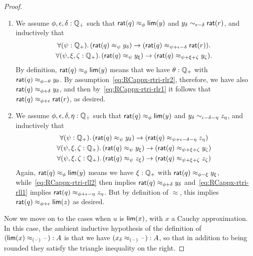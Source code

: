 \begin{proof}
\begin{enumerate}
  \item We assume $\phi,\epsilon,\delta:\mathbb{Q}_{+}$ such that $\mathsf{rat}(q)\approx_\phi \mathsf{lim}(y)$ and $y_\delta \sim_{\epsilon-\delta} \mathsf{rat}(r)$, and inductively that
    \begin{gather}
      \fall{\psi:\Qp}(\rcrat(q) \approx_{\psi} y_\delta) \to (\rcrat(q) \approx_{\psi+\epsilon-\delta} \rcrat(r)).\label{eq:RCappx-rtri-rlr1}\\
      \fall{\psi,\xi,\zeta:\Qp} (\rcrat(q) \approx_{\psi} y_\xi) \to (\rcrat(q) \approx_{\psi+\xi+\zeta} y_\zeta).\label{eq:RCappx-rtri-rlr2}
    \end{gather}
    By definition, $\mathsf{rat}(q)\approx_\phi \mathsf{lim}(y)$ means that we have $\theta:\mathbb{Q}_{+}$ with $\mathsf{rat}(q) \approx_{\phi-\theta} y_\theta$.
    By assumption~\eqref{eq:RCappx-rtri-rlr2}, therefore, we have also $\mathsf{rat}(q) \approx_{\phi+\delta} y_\delta$, and then by~\eqref{eq:RCappx-rtri-rlr1} it follows that $\mathsf{rat}(q) \approx_{\phi+\epsilon} \mathsf{rat}(r)$, as desired.
  \item We assume $\phi,\epsilon,\delta,\eta:\mathbb{Q}_{+}$ such that $\mathsf{rat}(q)\approx_\phi \mathsf{lim}(y)$ and $y_\delta \sim_{\epsilon-\delta-\eta} z_\eta$, and inductively that 
    \begin{gather}
      \fall{\psi:\Qp}(\rcrat(q) \approx_{\psi} y_\delta) \to (\rcrat(q) \approx_{\psi+\epsilon-\delta-\eta} z_\eta)\label{eq:RCappx-rtri-rll1}\\
      \fall{\psi,\xi,\zeta:\Qp} (\rcrat(q) \approx_{\psi} y_\xi) \to (\rcrat(q) \approx_{\psi+\xi+\zeta} y_\zeta)\label{eq:RCappx-rtri-rll2}\\
      \fall{\psi,\xi,\zeta:\Qp} (\rcrat(q) \approx_{\psi} z_\xi) \to (\rcrat(q) \approx_{\psi+\xi+\zeta} z_\zeta)\label{eq:RCappx-rtri-rll3}
    \end{gather}
    Again, $\mathsf{rat}(q)\approx_\phi \mathsf{lim}(y)$ means we have $\xi:\mathbb{Q}_{+}$ with $\mathsf{rat}(q) \approx_{\phi-\xi} y_\xi$, while~\eqref{eq:RCappx-rtri-rll2} then implies $\mathsf{rat}(q) \approx_{\phi+\delta} y_\delta$ and~\eqref{eq:RCappx-rtri-rll1} implies $\mathsf{rat}(q) \approx_{\phi+\epsilon-\eta} z_\eta$.
    But by definition of $\approx$, this implies $\mathsf{rat}(q) \approx_{\phi+\epsilon} \mathsf{lim}(z)$ as desired.
  \end{enumerate}
  Now we move on to the cases when $u$ is $\mathsf{lim}(x)$, with $x$ a Cauchy approximation.
  In this case, the ambient inductive hypothesis of the definition of $(\mathsf{lim}(x) \approx_{(\mathord{\hspace{1pt}\text{--}\hspace{1pt}})} {\mathord{\hspace{1pt}\text{--}\hspace{1pt}}}) : A$ is that we have ${(x_\delta \approx_{(\mathord{\hspace{1pt}\text{--}\hspace{1pt}})} {\mathord{\hspace{1pt}\text{--}\hspace{1pt}}})}: A$, so that in addition to being rounded they satisfy the triangle inequality on the right.

\end{proof}
